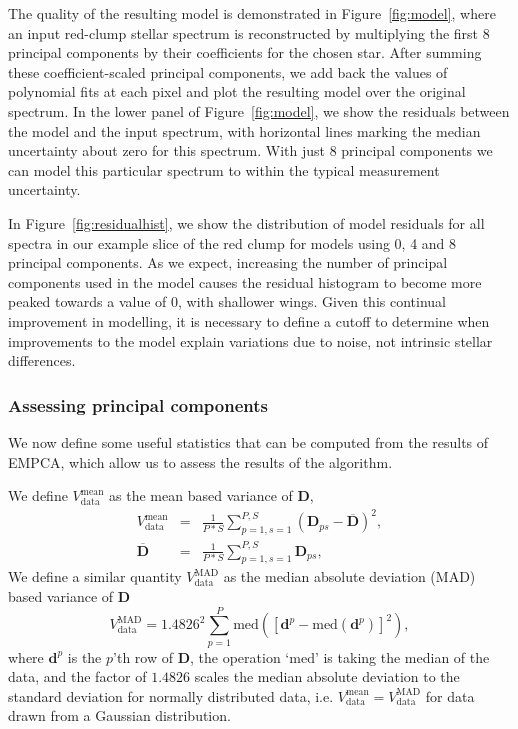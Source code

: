 \documentclass[a4paper,fleqn,usenatbib]{mnras}
\begin{document}
The quality of the resulting model is demonstrated in Figure~\ref{fig:model}, where an input red-clump stellar spectrum is reconstructed by multiplying the first 8 principal components by their  coefficients for the chosen star. After summing these coefficient-scaled principal components, we add back the values of polynomial fits at each pixel and plot the resulting model over the original spectrum. In the lower panel of Figure~\ref{fig:model}, we show the residuals between the model and the input spectrum, with horizontal lines marking the median uncertainty about zero for this spectrum. With just 8 principal components we can model this particular spectrum to within the typical measurement uncertainty. 

In Figure~\ref{fig:residualhist}, we show the distribution of model residuals for all spectra in our example slice of the red clump for models using 0, 4 and 8 principal components. As we expect, increasing the number of principal components used in the model causes the residual histogram to become more peaked towards a value of 0, with shallower wings. Given this continual improvement in modelling, it is necessary to define a cutoff to determine when improvements to the model explain variations due to noise, not intrinsic stellar differences.






\subsubsection{Assessing principal components}


We now define some useful statistics that can be computed from the results of EMPCA, which allow us to assess the results of the algorithm. 

We define $V_{\mathrm{data}}^{\mathrm{mean}}$ as the mean based variance of $\mathbf{D}$,
\begin{eqnarray}
	\label{eqn:meanvar}
	V_{\mathrm{data}}^{\mathrm{mean}} &=& \frac{1}{P*S}\sum_{p=1,s=1}^{P,S}\left(\mathbf{D}_{ps} - \overline{\mathbf{D}}\right)^2,\\
	\overline{\mathbf{D}} &=& \frac{1}{P* S} \sum_{p=1,s=1}^{P,S} \mathbf{D}_{ps},
\end{eqnarray}
We define a similar quantity $V_{\mathrm{data}}^{\mathrm{MAD}}$ as the median absolute deviation (MAD) based variance of $\mathbf{D}$
\begin{equation}
V_{\mathrm{data}}^{\mathrm{MAD}} = 1.4826^2\sum_{p=1}^{P}\mathrm{med}\left(\left[\mathbf{d}^p - \mathrm{med}\left(\mathbf{d}^p\right)\right]^2\right),
\label{eqn:madvar}
\end{equation}
where $\mathbf{d}^p$ is the $p$'th row of $\mathbf{D}$, the operation `$\mathrm{med}$' is taking the median of the data, and the factor of $1.4826$ scales the median absolute deviation to the standard deviation for normally distributed data, i.e. $V_{\mathrm{data}}^{\mathrm{mean}} = V_{\mathrm{data}}^{\mathrm{MAD}}$ for data drawn from a Gaussian distribution.
\end{document}
